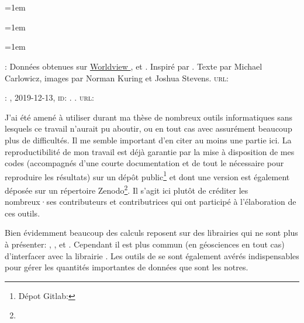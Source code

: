 
\chapter*{\bibname}
\mtcaddchapter[\bibname]
\markboth{\bibname}{}
\label{bib}

{
  \nocite{quenouille_1966}
  \emergencystretch=1em
  \printbibliography[heading=none, filter=normal]
}

\unsection{\bibdataTitle}
\label{bib:data}

{
  \emergencystretch=1em
  \printbibliography[heading=none, type=dataset]
}

\label{bib:illustration}

{
  \setlength{\parindent}{0pt}
  \emergencystretch=1em

  : Données obtenues sur \href{https://worldview.earthdata.nasa.gov}{Worldview },  et .
  Inspiré par .
  Texte par Michael Carlowicz, images par Norman Kuring et Joshua Stevens.
  \textsc{url:} 

  \medskip

  : , 2019-12-13, \textsc{id}: .
  .
  \textsc{url:} 
}

\unsection{\bibsoftwareTitle}
\label{bib:software}

J'ai été amené à utiliser durant ma thèse de nombreux outils informatiques sans lesquels ce travail n'aurait pu aboutir, ou en tout cas avec assurément beaucoup plus de difficultés.
Il me semble important d'en citer au moins une partie ici.
La reproductibilité de mon travail est déjà garantie par la mise à disposition de mes codes (accompagnés d'une courte documentation et de tout le nécessaire pour reproduire les résultats) sur un dépôt public\footnote{%
  Dépot Gitlab: }
et dont une version est également déposée sur un répertoire Zenodo\footnote{}.
Il s'agit ici plutôt de créditer les nombreux·ses contributeurs et contributrices qui ont participé à l'élaboration de ces outils.

Bien évidemment beaucoup des calculs reposent sur des librairies qui ne sont plus à présenter: , , et .
Cependant il est plus commun (en géosciences en tout cas) d'interfacer avec la librairie .
Les outils de  se sont également avérés indispensables pour gérer les quantités importantes de données que sont les notres.

